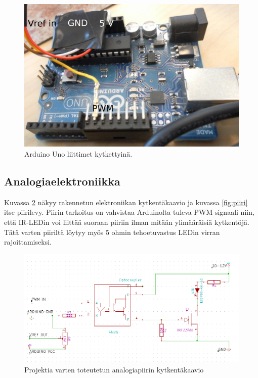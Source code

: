\documentclass[finnish,12pt]{article}
\begin{document}
\begin{figure}[htcb]
 \begin{center}
  \includegraphics[scale=0.4]{kuvat/arduino.jpg}
  \caption{Arduino Uno liittimet kytkettyinä.}
  \label{fig:arduino}
 \end{center}

\end{figure}



\subsection{Analogiaelektroniikka}

Kuvassa \ref{fig:schema} näkyy rakennetun elektroniikan kytkentäkaavio ja kuvassa \ref{fig:piiri} itse piirilevy. Piirin tarkoitus on vahvistaa Arduinolta tuleva PWM-signaali niin, että IR-LEDin voi liittää suoraan piiriin ilman mitään ylimääräisiä kytkentöjä. Tätä varten piiriltä löytyy myös 5 ohmin tehoetuvastus LEDin virran rajoittamiseksi.

\begin{figure}[htcb]
 \begin{center}
 \includegraphics[scale=0.5]{kuvat/schema.png}
 \caption{Projektia varten toteutetun analogiapiirin kytkentäkaavio}
 \label{fig:schema}
 \end{center}
\end{figure}
\end{document}
